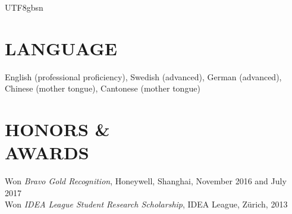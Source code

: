 \documentclass[margin, 10pt]{res} %
\begin{document}
\begin{resume}
\begin{CJK}{UTF8}{gbsn}

\section{LANGUAGE}
English (professional proficiency), Swedish (advanced), German (advanced), Chinese (mother tongue), Cantonese (mother tongue)


\section{HONORS \& \\ AWARDS}
Won {\it Bravo Gold Recognition}, Honeywell, Shanghai, November 2016 and July 2017 \\
Won {\it IDEA League Student Research Scholarship}, IDEA League, Zürich, 2013


\end{CJK}
\end{resume}
\end{document}
